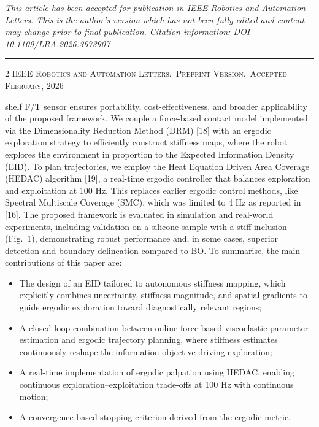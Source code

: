 \documentclass[11pt]{article}
\begin{document}
\begin{center}
{\footnotesize\itshape
This article has been accepted for publication in IEEE Robotics and
Automation Letters. This is the author's version which has not been
fully edited and content may change prior to final publication.
Citation information: DOI 10.1109/LRA.2026.3673907\par}
\end{center}

\vspace{0.4em}
\hrule
\vspace{0.6em}

\noindent
{\footnotesize\scshape 2 \hfill IEEE Robotics and Automation Letters.\ Preprint Version.\ Accepted February, 2026}

\vspace{1.2em}

\noindent
shelf F/T sensor ensures portability, cost-effectiveness, and broader
applicability of the proposed framework. We couple a force-based
contact model implemented via the Dimensionality Reduction Method
(DRM) [18] with an ergodic exploration strategy to efficiently
construct stiffness maps, where the robot explores the environment in
proportion to the Expected Information Density (EID). To plan
trajectories, we employ the Heat Equation Driven Area Coverage
(HEDAC) algorithm [19], a real-time ergodic controller that balances
exploration and exploitation at 100 Hz. This replaces earlier ergodic
control methods, like Spectral Multiscale Coverage (SMC), which was
limited to 4 Hz as reported in [16]. The proposed framework is
evaluated in simulation and real-world experiments, including
validation on a silicone sample with a stiff inclusion (Fig.~1),
demonstrating robust performance and, in some cases, superior
detection and boundary delineation compared to BO. To summarise, the
main contributions of this paper are:

\begin{itemize}
\item The design of an EID tailored to autonomous stiffness mapping,
which explicitly combines uncertainty, stiffness magnitude, and
spatial gradients to guide ergodic exploration toward diagnostically
relevant regions;
\item A closed-loop combination between online force-based
viscoelastic parameter estimation and ergodic trajectory planning,
where stiffness estimates continuously reshape the information
objective driving exploration;
\item A real-time implementation of ergodic palpation using HEDAC,
enabling continuous exploration--exploitation trade-offs at 100 Hz
with continuous motion;
\item A convergence-based stopping criterion derived from the ergodic
metric.
\end{itemize}
\end{document}
